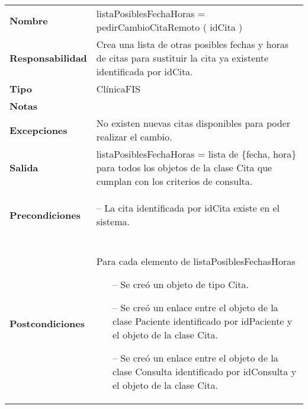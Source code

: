  \begin{table}[H]
  \centering
  \begin{tabularx}{\textwidth}{l|X}
    \textbf{Nombre}        &  listaPosiblesFechaHoras = pedirCambioCitaRemoto ( idCita ) \\ 
    \textbf{Responsabilidad}  &  Crea una lista de otras posibles fechas y horas
    de citas para sustituir la cita ya existente identificada por idCita.\\ 
    \textbf{Tipo}        &  ClínicaFIS \\ 
    \textbf{Notas}        &  \\ 
    \textbf{Excepciones}    & No existen nuevas citas disponibles para poder
    realizar el cambio.\\
    \textbf{Salida}        &  listaPosiblesFechaHoras = lista de \{fecha, hora\} para todos los objetos de la clase Cita que cumplan con los criterios de consulta. \\ 
    \textbf{Precondiciones}    &
    \begin{itemizenomargins}
    \item[--] La cita identificada por idCita existe en el sistema.
    \end{itemizenomargins} \\ \\
    \textbf{Postcondiciones}  & Para cada elemento de listaPosiblesFechasHoras
     \begin{itemize}
    \item[--] Se creó un objeto de tipo Cita.
    \item[--] Se creó un enlace entre el objeto de la clase Paciente identificado
      por idPaciente y el objeto de la clase Cita.
    \item[--] Se creó un enlace entre el objeto de la clase Consulta identificado
      por idConsulta y el objeto de la clase Cita.
    \end{itemize}
  \end{tabularx}
\end{table}

